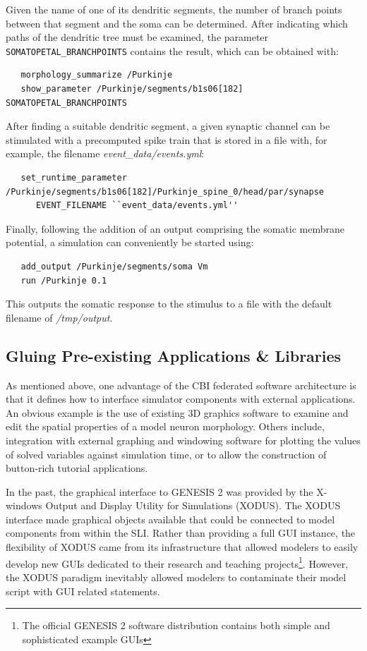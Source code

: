 \documentclass[12pt]{article}
\begin{document}
Given the name of one of its dendritic segments, the number of branch
points between that segment and the soma can be determined. After
indicating which paths of the dendritic tree must be examined, the
parameter {\tt SOMATOPETAL\_BRANCHPOINTS} contains the result, which
can be obtained with:

{\footnotesize
\begin{verbatim}
   morphology_summarize /Purkinje
   show_parameter /Purkinje/segments/b1s06[182] SOMATOPETAL_BRANCHPOINTS
\end{verbatim}
}

After finding a suitable dendritic segment, a given synaptic channel can
be stimulated with a precomputed spike train that is stored in a file
with, for example, the filename {\it event\_data/events.yml}:

{\footnotesize
\begin{verbatim}
   set_runtime_parameter /Purkinje/segments/b1s06[182]/Purkinje_spine_0/head/par/synapse
      EVENT_FILENAME ``event_data/events.yml''
\end{verbatim}
}

Finally, following the addition of an output comprising the somatic membrane potential, a simulation can conveniently be started using:

{\footnotesize
\begin{verbatim}
   add_output /Purkinje/segments/soma Vm
   run /Purkinje 0.1
\end{verbatim}
}

This outputs the somatic response to the stimulus to a file with the
default filename of {\it /tmp/output}.


\subsection{Gluing Pre-existing Applications \& Libraries}

As mentioned above, one advantage of the CBI federated software
architecture is that it defines how to interface simulator components
with external applications.  An obvious example is the use of existing
3D graphics software to examine and edit the spatial properties of a
model neuron morphology.  Others include, integration with external
graphing and windowing software for plotting the values of solved
variables against simulation time, or to allow the construction of
button-rich tutorial applications.

In the past, the graphical interface to GENESIS 2 was provided by the
X-windows Output and Display Utility for Simulations (XODUS).  The
XODUS interface made graphical objects available that could be
connected to model components from within the SLI.  Rather than
providing a full GUI instance, the flexibility of XODUS came from its
infrastructure that allowed modelers to easily develop new GUIs
dedicated to their research and teaching projects\footnote{The
  official GENESIS 2 software distribution contains both simple and
  sophisticated example GUIs}.  However, the XODUS paradigm inevitably
allowed modelers to contaminate their model script with GUI related
statements.
\end{document}
